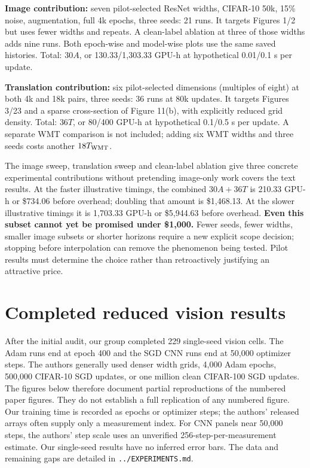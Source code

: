 \documentclass{article}
\begin{document}
\textbf{Image contribution:} seven pilot-selected ResNet widths, CIFAR-10
50k, 15\% noise, augmentation, full 4k epochs, three seeds: 21 runs.
It targets Figures 1/2 but uses fewer widths and repeats. A clean-label
ablation at three of those widths adds nine runs. Both epoch-wise and
model-wise plots use the same saved histories. Total: $30A$, or
130.33/1,303.33 GPU-h at hypothetical 0.01/0.1 s per update.

\textbf{Translation contribution:} six pilot-selected dimensions (multiples
of eight) at both 4k and 18k pairs, three seeds: 36 runs at 80k updates.
It targets Figures 3/23 and a sparse cross-section of Figure 11(b), with
explicitly reduced grid density. Total: $36T$, or 80/400 GPU-h at
hypothetical 0.1/0.5 s per update. A separate WMT comparison is not included;
adding six WMT widths and three seeds costs another $18T_{\rm WMT}$.

The image sweep, translation sweep and clean-label ablation give three
concrete experimental contributions without pretending image-only work
covers the text results. At the faster illustrative timings, the combined
$30A+36T$ is 210.33 GPU-h or \$734.06 before overhead; doubling that amount
is \$1,468.13. At the slower illustrative timings it is 1,703.33 GPU-h or
\$5,944.63 before overhead. \textbf{Even this subset cannot yet be promised
under \$1,000.} Fewer seeds, fewer widths, smaller image subsets or shorter
horizons require a new explicit scope decision; stopping before interpolation
can remove the phenomenon being tested. Pilot results must determine the
choice rather than retroactively justifying an attractive price.


\section{Completed reduced vision results}
After the initial audit, our group completed 229 single-seed vision cells.
The Adam runs end at epoch 400 and the SGD CNN runs end at 50,000 optimizer
steps. The authors generally used denser width grids, 4,000 Adam epochs,
500,000 CIFAR-10 SGD updates, or one million clean CIFAR-100 SGD updates.
The figures below therefore document partial reproductions of the numbered
paper figures. They do not establish a full replication of any numbered
figure. Our training time is recorded as epochs or optimizer steps; the
authors' released arrays often supply only a measurement index. For CNN
panels near 50,000 steps, the authors' step scale uses an unverified
256-step-per-measurement estimate. Our single-seed results have no inferred
error bars. The data and remaining gaps are detailed in
\texttt{../EXPERIMENTS.md}.
\end{document}
